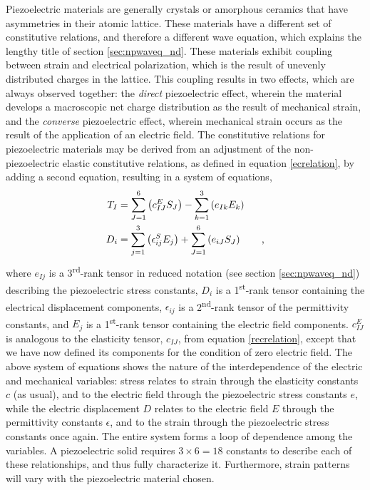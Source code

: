 \documentclass[a4paper,10pt]{report}
\numberwithin{equation}{section}
\begin{document}
Piezoelectric materials are generally crystals or amorphous ceramics that have asymmetries in their atomic lattice. \cite[p.~17]{Kino1987} These materials have a different set of constitutive relations, and therefore a different wave equation, which explains the lengthy title of section \ref{sec:npwaveq_nd}. These materials exhibit coupling between strain and electrical polarization, which is the result of unevenly distributed charges in the lattice. This coupling results in two effects, which are always observed together: the \emph{direct} piezoelectric effect, wherein the material develops a macroscopic net charge distribution as the result of mechanical strain, and the \emph{converse} piezoelectric effect, wherein mechanical strain occurs as the result of the application of an electric field. \cite[p.~23]{Ballantine1997} The constitutive relations for piezoelectric materials may be derived from an adjustment of the non-piezoelectric elastic constitutive relations, as defined in equation \eqref{ecrelation},
 by adding a second equation, resulting in a system of equations\cite[p.~24]{Ballantine1997},
\begin{align}\label{pecrelation}
T_I &= \sum_{J=1}^6 \left( c_{IJ}^E S_J \right)- \sum_{k=1}^3 \left( e_{Ik}E_k \right) \notag\\
D_i &= \sum_{j = 1}^3 \left( \epsilon_{ij}^S E_j \right) + \sum_{J = 1}^6 \left( e_{iJ} S_J \right) \qquad \text{,}
\end{align}
where $e_{Ij}$ is a 3\textsuperscript{rd}-rank tensor in reduced notation (see section \ref{sec:npwaveq_nd}) describing the piezoelectric stress constants, $D_i$ is a 1\textsuperscript{st}-rank tensor containing the electrical displacement components, $\epsilon_{ij}$ is a 2\textsuperscript{nd}-rank tensor of the permittivity constants, and $E_j$ is a 1\textsuperscript{st}-rank tensor containing the electric field components. \cite[p.~24]{Ballantine1997}$c_{IJ}^E$ is analogous to the elasticity tensor, $c_{IJ}$, from equation \eqref{recrelation}, except that we have now defined its components for the condition of zero electric field. \cite[p.~19]{Kino1987} The above system of equations shows the nature of the interdependence of the electric and mechanical variables: stress relates to strain through the elasticity constants $c$ (as usual), and to the electric field through the piezoelectric stress constants $e$, while the electric displacement $D$ relates to the electric field $E$ through the permittivity 
constants $\epsilon$, and to the strain through the piezoelectric stress constants once again. The entire system forms a loop of dependence among the variables. A piezoelectric solid requires $3\times6 = 18$ constants to describe each of these relationships, and thus fully characterize it. Furthermore, strain patterns will vary with the piezoelectric material chosen. \cite[p.~24]{Ballantine1997}
\end{document}
